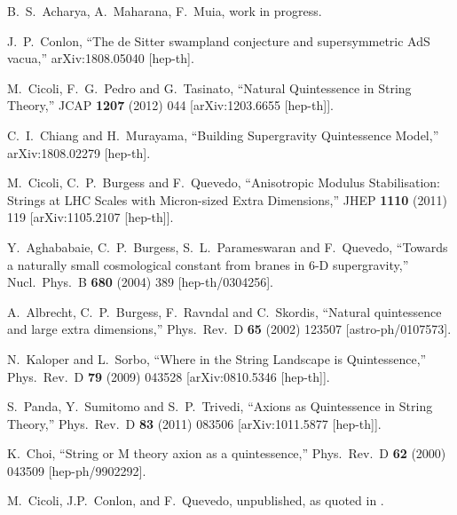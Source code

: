 \documentclass[11pt,a4paper]{article}
\begin{document}
\begin{itemize}
\begin{thebibliography}{99}
B.~S.~Acharya, A.~Maharana, F.~Muia, work in progress.
	
  J.~P.~Conlon,
  ``The de Sitter swampland conjecture and supersymmetric AdS vacua,''
  arXiv:1808.05040 [hep-th].
	
  M.~Cicoli, F.~G.~Pedro and G.~Tasinato,
  ``Natural Quintessence in String Theory,''
  JCAP {\bf 1207} (2012) 044
  [arXiv:1203.6655 [hep-th]].

  C.~I.~Chiang and H.~Murayama,
  ``Building Supergravity Quintessence Model,''
  arXiv:1808.02279 [hep-th].

  M.~Cicoli, C.~P.~Burgess and F.~Quevedo,
  ``Anisotropic Modulus Stabilisation: Strings at LHC Scales with Micron-sized Extra Dimensions,''
  JHEP {\bf 1110} (2011) 119
  [arXiv:1105.2107 [hep-th]].

  Y.~Aghababaie, C.~P.~Burgess, S.~L.~Parameswaran and F.~Quevedo,
  ``Towards a naturally small cosmological constant from branes in 6-D supergravity,''
  Nucl.\ Phys.\ B {\bf 680} (2004) 389
  [hep-th/0304256].

  A.~Albrecht, C.~P.~Burgess, F.~Ravndal and C.~Skordis,
  ``Natural quintessence and large extra dimensions,''
  Phys.\ Rev.\ D {\bf 65} (2002) 123507
  [astro-ph/0107573].

  N.~Kaloper and L.~Sorbo,
  ``Where in the String Landscape is Quintessence,''
  Phys.\ Rev.\ D {\bf 79} (2009) 043528
  [arXiv:0810.5346 [hep-th]].

  S.~Panda, Y.~Sumitomo and S.~P.~Trivedi,
  ``Axions as Quintessence in String Theory,''
  Phys.\ Rev.\ D {\bf 83} (2011) 083506
  [arXiv:1011.5877 [hep-th]].

  K.~Choi,
  ``String or M theory axion as a quintessence,''
  Phys.\ Rev.\ D {\bf 62} (2000) 043509
  [hep-ph/9902292].

M.~Cicoli, J.P.~Conlon, and F.~Quevedo, unpublished, as quoted in \cite{Kaloper:2008qs}.  


\end{thebibliography}
\end{itemize}
\end{document}
